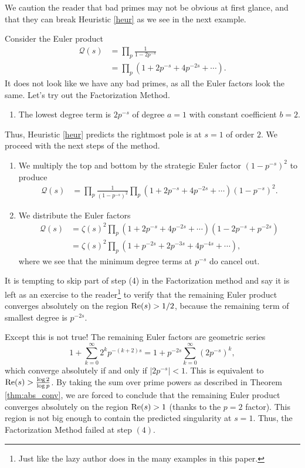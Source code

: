\documentclass[12pt]{amsart}
\newenvironment{BOXexample}{
\begin{exbox}\mbox{}
\begin{example}
}
{
\end{example}
\end{exbox}
}
\theoremstyle{plain}
\begin{document}
We caution the reader that bad primes may not be obvious at first glance, and that they can break Heuristic \ref{heur} as we see in the next example.

\begin{BOXexample}\label{ex:bad_euler_factor}
    Consider the Euler product
    \begin{align*}
    \mathcal{Q}(s) &= \prod_p \frac{1}{1 - 2p^{-s}}\\
    &=\prod_p(1 + 2p^{-s} + 4p^{-2s} + \cdots ).
    \end{align*}
    It does not look like we have any bad primes, as all the Euler factors look the same. Let's try out the Factorization Method.
    \begin{enumerate}[(1)]
        \item The lowest degree term is $2p^{-s}$ of degree $a=1$ with constant coefficient $b=2$.
    \end{enumerate}
    Thus, Heuristic \ref{heur} predicts the rightmost pole is at $s=1$ of order $2$. We proceed with the next steps of the method.
    \begin{enumerate}
        \item[(2)] We multiply the top and bottom by the strategic Euler factor $(1 - p^{-s})^{2}$ to produce
        \begin{align*}
            \mathcal{Q}(s) &= \prod_p \frac{1}{(1-p^{-s})^2} \prod_p (1+2p^{-s}+4p^{-2s}+\cdots)(1-p^{-s})^2.
        \end{align*}
        \item[(3)] We distribute the Euler factors
        \begin{align*}
            \mathcal{Q}(s) &=\zeta(s)^2 \prod_p (1+2p^{-s}+4p^{-2s}+\cdots)(1-2p^{-s}+p^{-2s})\\
            &=\zeta(s)^2 \prod_p (1+p^{-2s}+2p^{-3s}+4p^{-4s}+\cdots),
        \end{align*}
        where we see that the minimum degree terms at $p^{-s}$ do cancel out.
    \end{enumerate}

    It is tempting to skip part of step (4) in the Factorization method and say it is left as an exercise to the reader\footnote{Just like the lazy author does in the many examples in this paper.} to verify that the remaining Euler product converges absolutely on the region ${\rm Re}(s)>1/2$, because the remaining term of smallest degree is $p^{-2s}$.

    Except this is not true! The remaining Euler factors are geometric series
    \[
    1 + \sum_{k=0}^\infty 2^{k}p^{-(k+2)s} = 1 + p^{-2s}\sum_{k=0}^\infty (2p^{-s})^k,
    \]
    which converge absolutely if and only if $|2p^{-s}| < 1$. This is equivalent to ${\rm Re}(s) > \frac{\log 2}{\log p}$. By taking the sum over prime powers as described in Theorem \ref{thm:abs_conv}, we are forced to conclude that the remaining Euler product converges absolutely on the region ${\rm Re}(s) > 1$ (thanks to the $p=2$ factor). This region is not big enough to contain the predicted singularity at $s=1$. Thus, the Factorization Method failed at step $(4)$.


\end{BOXexample}
\end{document}
